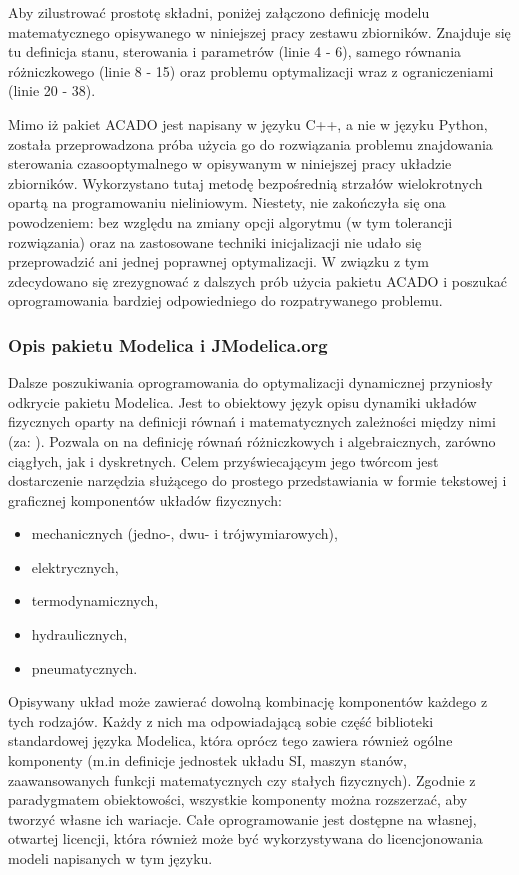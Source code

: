 Aby zilustrować prostotę składni, poniżej załączono definicję modelu matematycznego opisywanego w niniejszej pracy zestawu zbiorników. Znajduje się tu definicja stanu, sterowania i parametrów (linie 4 - 6), samego równania różniczkowego (linie 8 - 15) oraz problemu optymalizacji wraz z ograniczeniami (linie 20 - 38).



Mimo iż pakiet ACADO jest napisany w języku C++, a nie w języku Python, została przeprowadzona próba użycia go do rozwiązania problemu znajdowania sterowania czasooptymalnego w opisywanym w niniejszej pracy układzie zbiorników. Wykorzystano tutaj metodę bezpośrednią strzałów wielokrotnych opartą na programowaniu nieliniowym. Niestety, nie zakończyła się ona powodzeniem: bez względu na zmiany opcji algorytmu (w tym tolerancji rozwiązania) oraz na zastosowane techniki inicjalizacji nie udało się przeprowadzić ani jednej poprawnej optymalizacji. W związku z tym zdecydowano się zrezygnować z dalszych prób użycia pakietu ACADO i poszukać oprogramowania bardziej odpowiedniego do rozpatrywanego problemu.

\subsubsection{Opis pakietu Modelica i JModelica.org}

Dalsze poszukiwania oprogramowania do optymalizacji dynamicznej przyniosły odkrycie pakietu Modelica. Jest to obiektowy język opisu dynamiki układów fizycznych oparty na definicji równań i matematycznych zależności między nimi (za: \cite{ModelicaWebsite}). Pozwala on na definicję równań różniczkowych i algebraicznych, zarówno ciągłych, jak i dyskretnych.
Celem przyświecającym jego twórcom jest dostarczenie narzędzia służącego do prostego przedstawiania w formie tekstowej i graficznej komponentów układów fizycznych:
\begin{itemize}
    \item mechanicznych (jedno-, dwu- i trójwymiarowych),
    \item elektrycznych,
    \item termodynamicznych,
    \item hydraulicznych,
    \item pneumatycznych.
\end{itemize}

Opisywany układ może zawierać dowolną kombinację komponentów każdego z tych rodzajów. Każdy z nich ma odpowiadającą sobie część biblioteki standardowej języka Modelica, która oprócz tego zawiera również ogólne komponenty (m.in definicje jednostek układu SI, maszyn stanów, zaawansowanych funkcji matematycznych czy stałych fizycznych).
Zgodnie z paradygmatem obiektowości, wszystkie komponenty można rozszerzać, aby tworzyć własne ich wariacje.
Całe oprogramowanie jest dostępne na własnej, otwartej licencji, która również może być wykorzystywana do licencjonowania modeli napisanych w tym języku.

